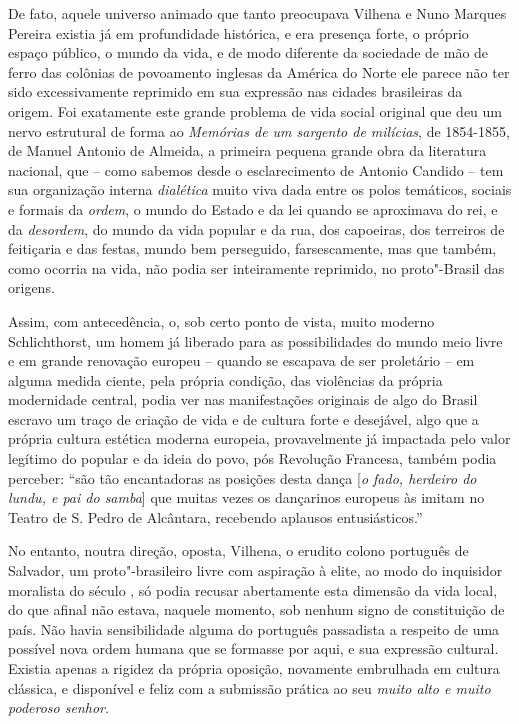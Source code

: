 De fato, aquele universo animado que tanto preocupava Vilhena e Nuno
Marques Pereira existia já em profundidade histórica, e era presença
forte, o próprio espaço público, o mundo da vida, e de modo diferente da
sociedade de mão de ferro das colônias de povoamento inglesas da América
do Norte ele parece não ter sido excessivamente reprimido em sua
expressão nas cidades brasileiras da origem. Foi exatamente este grande
problema de vida social original que deu um nervo estrutural de forma ao
\emph{Memórias de um sargento de milícias}, de 1854-1855, de Manuel
Antonio de Almeida, a primeira pequena grande obra da literatura
nacional, que -- como sabemos desde o esclarecimento de Antonio Candido
-- tem sua organização interna \emph{dialética} muito viva dada entre os
polos temáticos, sociais e formais da \emph{ordem}, o mundo do Estado e
da lei quando se aproximava do rei, e da \emph{desordem}, do mundo da
vida popular e da rua, dos capoeiras, dos terreiros de feitiçaria e das
festas, mundo bem perseguido, farsescamente, mas que também, como
ocorria na vida, não podia ser inteiramente reprimido, no proto"-Brasil
das origens.

Assim, com antecedência, o, sob certo ponto de vista, muito moderno
Schlichthorst, um homem já liberado para as possibilidades do mundo meio
livre e em grande renovação europeu -- quando se escapava de ser
proletário -- em alguma medida ciente, pela própria condição, das
violências da própria modernidade central, podia ver nas manifestações
originais de algo do Brasil escravo um traço de criação de vida e de
cultura forte e desejável, algo que a própria cultura estética moderna
europeia, provavelmente já impactada pelo valor legítimo do popular e da
ideia do povo, pós Revolução Francesa, também podia perceber: ``são tão
encantadoras as posições desta dança {[}\emph{o fado, herdeiro do lundu,
e pai do samba}{]} que muitas vezes os dançarinos europeus às imitam no
Teatro de S. Pedro de Alcântara, recebendo aplausos entusiásticos.''

No entanto, noutra direção, oposta, Vilhena, o erudito colono português
de Salvador, um proto"-brasileiro livre com aspiração à elite, ao modo do
inquisidor moralista do século , só podia recusar abertamente esta
dimensão da vida local, do que afinal não estava, naquele momento, sob
nenhum signo de constituição de país. Não havia sensibilidade alguma do
português passadista a respeito de uma possível nova ordem humana que se
formasse por aqui, e sua expressão cultural. Existia apenas a rigidez da
própria oposição, novamente embrulhada em cultura clássica, e disponível
e feliz com a submissão prática ao seu \emph{muito alto e muito poderoso
senhor}.

